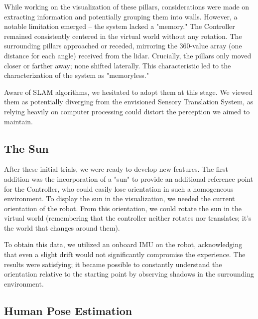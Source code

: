 \documentclass{Configuration_Files/PoliMi3i_thesis}
\begin{document}
While working on the visualization of these pillars, considerations were made on extracting information and potentially grouping them into walls. However, a notable limitation emerged – the system lacked a "memory." The Controller remained consistently centered in the virtual world without any rotation. The surrounding pillars approached or receded, mirroring the 360-value array (one distance for each angle) received from the lidar. Crucially, the pillars only moved closer or farther away; none shifted laterally. This characteristic led to the characterization of the system as "memoryless."

Aware of SLAM algorithms, we hesitated to adopt them at this stage. We viewed them as potentially diverging from the envisioned Sensory Translation System, as relying heavily on computer processing could distort the perception we aimed to maintain.

\subsection{The Sun}
After these initial trials, we were ready to develop new features. The first addition was the incorporation of a "sun" to provide an additional reference point for the Controller, who could easily lose orientation in such a homogeneous environment. To display the sun in the visualization, we needed the current orientation of the robot. From this orientation, we could rotate the sun in the virtual world (remembering that the controller neither rotates nor translates; it's the world that changes around them).

To obtain this data, we utilized an onboard IMU on the robot, acknowledging that even a slight drift would not significantly compromise the experience. The results were satisfying; it became possible to constantly understand the orientation relative to the starting point by observing shadows in the surrounding environment.

\subsection{Human Pose Estimation}
\end{document}
